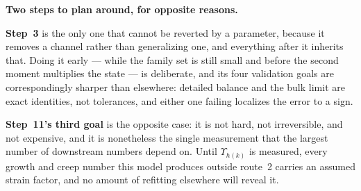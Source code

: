 \documentclass{article}
\begin{document}
\textbf{Two steps to plan around, for opposite reasons.}

\textbf{Step~3} is the only one that cannot be reverted by a parameter, because
it removes a channel rather than generalizing one, and everything after it
inherits that. Doing it early --- while the family set is still small and before
the second moment multiplies the state --- is deliberate, and its four validation
goals are correspondingly sharper than elsewhere: detailed balance and the bulk
limit are exact identities, not tolerances, and either one failing localizes the
error to a sign.

\textbf{Step~11's third goal} is the opposite case: it is not hard, not
irreversible, and not expensive, and it is nonetheless the single measurement
that the largest number of downstream numbers depend on. Until $\Upsilon_{h(k)}$
is measured, every growth and creep number this model produces outside route~2
carries an assumed strain factor, and no amount of refitting elsewhere will
reveal it.

\newpage


\end{document}
